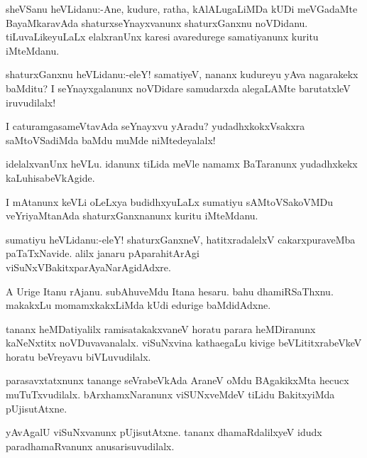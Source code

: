 \documentclass{article}
\begin{document}
\begin{mn}%
sheVSanu heVLidanu:-Ane, kudure, ratha, kAlALugaLiMDa kUDi meVGadaMte BayaMkaravAda 
shaturxseYnayxvanunx shaturxGanxnu noVDidanu. tiLuvaLikeyuLaLx elalxranUnx karesi 
avaredurege samatiyanunx kuritu iMteMdanu.
\end{mn}

\begin{mn}%
shaturxGanxnu heVLidanu:-eleY! samatiyeV, nananx kudureyu yAva nagarakekx baMditu? I 
seYnayxgalanunx noVDidare samudarxda alegaLAMte barutatxleV iruvudilalx!
\end{mn}

\begin{mn}%
I caturamgasameVtavAda seYnayxvu yAradu? yudadhxkokxVsakxra saMtoVSadiMda baMdu muMde 
niMtedeyalalx!
\end{mn}

\begin{mn}%
idelalxvanUnx heVLu. idanunx tiLida meVle namamx BaTaranunx yudadhxkekx kaLuhisabeVkAgide.
\end{mn}

\begin{mn}%
I mAtanunx keVLi oLeLxya budidhxyuLaLx sumatiyu sAMtoVSakoVMDu veYriyaMtanAda 
shaturxGanxnanunx kuritu iMteMdanu.
\end{mn}

\begin{mn}%
sumatiyu heVLidanu:-eleY! shaturxGanxneV, hatitxradalelxV cakarxpuraveMba paTaTxNavide. 
alilx janaru pAparahitArAgi viSuNxVBakitxparAyaNarAgidAdxre. 
\end{mn}

\begin{mn}%
A Urige Itanu rAjanu. subAhuveMdu Itana hesaru. bahu dhamiRSaThxnu. makakxLu 
momamxkakxLiMda kUdi edurige baMdidAdxne.
\end{mn}

\begin{mn}%
tananx heMDatiyalilx ramisatakakxvaneV horatu parara heMDiranunx kaNeNxtitx noVDuvavanalalx.
viSuNxvina kathaegaLu kivige beVLititxrabeVkeV horatu beVreyavu biVLuvudilalx.
\end{mn}

\begin{mn}%
parasavxtatxnunx tanange seVrabeVkAda AraneV oMdu BAgakikxMta hecucx muTuTxvudilalx. 
bArxhamxNaranunx viSUNxveMdeV tiLidu BakitxyiMda pUjisutAtxne.
\end{mn}

\begin{mn}%
yAvAgalU viSuNxvanunx pUjisutAtxne. tananx dhamaRdalilxyeV idudx paradhamaRvanunx 
anusarisuvudilalx.
\end{mn}
\end{document}
